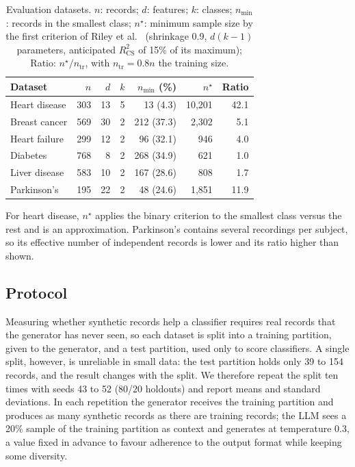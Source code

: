 \documentclass[conference]{IEEEtran}
\begin{document}
\begin{table}[t]
\centering
\caption{Evaluation datasets. $n$: records; $d$: features; $k$: classes; $n_{\min}$: records in the smallest class; $n^{\star}$: minimum sample size by the first criterion of Riley et al.~\cite{riley2019binary} (shrinkage 0.9, $d(k-1)$ parameters, anticipated $R^2_{\mathrm{CS}}$ of 15\% of its maximum); Ratio: $n^{\star}/n_{\mathrm{tr}}$, with $n_{\mathrm{tr}}=0.8n$ the training size.}
\label{tab:datasets}
\footnotesize
\setlength{\tabcolsep}{3pt}
\begin{tabular*}{\columnwidth}{@{\extracolsep{\fill}}lrrrrrr@{}}
\toprule
Dataset & $n$ & $d$ & $k$ & $n_{\min}$ (\%) & $n^{\star}$ & Ratio \\
\midrule
Heart disease & 303 & 13 & 5 & 13 (4.3) & 10,201 & 42.1 \\
Breast cancer & 569 & 30 & 2 & 212 (37.3) & 2,302 & 5.1 \\
Heart failure & 299 & 12 & 2 & 96 (32.1) & 946 & 4.0 \\
Diabetes & 768 & 8 & 2 & 268 (34.9) & 621 & 1.0 \\
Liver disease & 583 & 10 & 2 & 167 (28.6) & 808 & 1.7 \\
Parkinson's & 195 & 22 & 2 & 48 (24.6) & 1,851 & 11.9 \\
\bottomrule
\end{tabular*}
\par\vspace{2pt}\raggedright\scriptsize For heart disease, $n^{\star}$ applies the binary criterion to the smallest class versus the rest and is an approximation. Parkinson's contains several recordings per subject, so its effective number of independent records is lower and its ratio higher than shown.
\end{table}

\subsection{Protocol}
Measuring whether synthetic records help a classifier requires real records that the generator has never seen, so each dataset is split into a training partition, given to the generator, and a test partition, used only to score classifiers. A single split, however, is unreliable in small data: the test partition holds only 39 to 154 records, and the result changes with the split. We therefore repeat the split ten times with seeds 43 to 52 (80/20 holdouts) and report means and standard deviations. In each repetition the generator receives the training partition and produces as many synthetic records as there are training records; the LLM sees a 20\% sample of the training partition as context and generates at temperature 0.3, a value fixed in advance to favour adherence to the output format while keeping some diversity.
\end{document}

